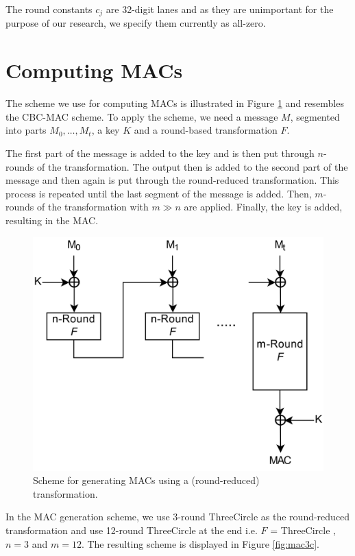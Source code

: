 \documentclass{report}
\newcommand{\ThreeCircle}{{\sc ThreeCircle} }
\begin{document}
The round constants $c_j$ are 32-digit lanes and as they are unimportant for the purpose of our research,
we specify them currently as all-zero.


\section{Computing MACs}
The scheme we use for computing MACs is illustrated in Figure \ref{fig:mac} and resembles the CBC-MAC scheme. To apply the scheme, we need a message $M$, segmented into parts $M_0, \dots, M_t$, a key $K$ and a round-based transformation $F$.

The first part of the message is added to the key and is then put through $n$-rounds of the transformation. The output then is added to the second part of the message and then again is put through the round-reduced transformation. This process is repeated until the last segment of the message is added. Then, $m$-rounds of the transformation with $m \gg n$ are applied. Finally, the key is added, resulting in the MAC.

\begin{figure}[!ht]
\centering
\includegraphics[scale=0.120]{imgs/HMAC_HighResV2.png}
\caption{Scheme for generating MACs using a (round-reduced) transformation.}
\label{fig:mac}
\end{figure}

In the MAC generation scheme, we use 3-round \ThreeCircle as the round-reduced transformation and use 12-round \ThreeCircle at the end i.e. $F$ = \ThreeCircle, $n=3$ and $m=12$. The resulting scheme is displayed in Figure \ref{fig:mac3c}.
\end{document}
